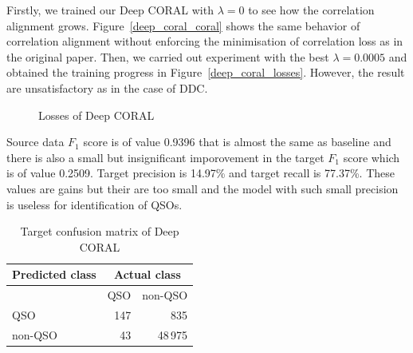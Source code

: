 Firstly, we trained our Deep CORAL with \(\lambda = 0\) to see
how the correlation alignment grows.
Figure~\ref{deep_coral_coral} shows the same behavior of correlation alignment
without enforcing the minimisation of correlation loss as in the original paper.
Then, we carried out experiment with the best \(\lambda = 0.0005\)
and obtained the training progress in Figure~\ref{deep_coral_losses}.
However, the result are unsatisfactory as in the case of DDC.

\begin{figure}
	\caption{Losses of Deep CORAL}
\end{figure}

Source data \(F_1\) score is of value 0.9396
that is almost the same as baseline
and there is also a small but insignificant imporovement in the target \(F_1\) score
which is of value 0.2509.
Target precision is 14.97\% and target recall is 77.37\%.
These values are gains but their are too small
and the model with such small precision is useless for identification of QSOs.

\begin{table}
\begin{center}
\begin{tabular}{|l|r|r|}
	\hline
	Predicted class & \multicolumn{2}{c|}{Actual class} \\
	\hline \hline
	& QSO & non-QSO \\ \hline
	QSO & 147 & 835 \\ \hline
	non-QSO & 43 & 48\,975 \\ \hline
\end{tabular}
\end{center}
\caption{Target confusion matrix of Deep CORAL}
\end{table}

